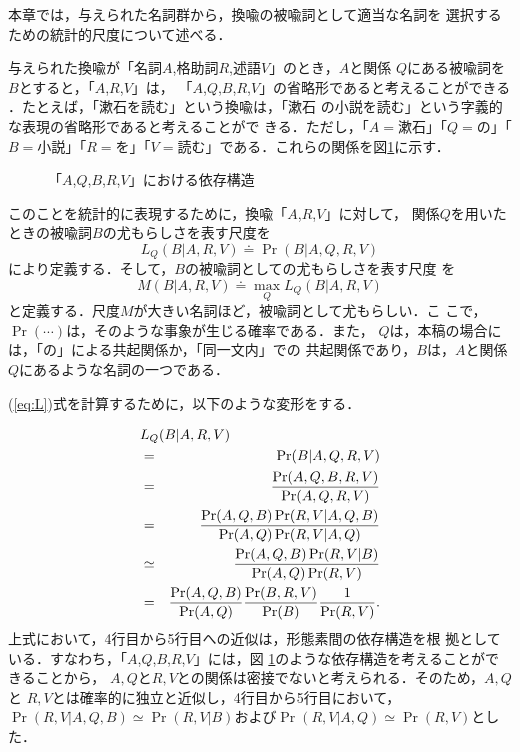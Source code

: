 本章では，与えられた名詞群から，換喩の被喩詞として適当な名詞を
選択するための統計的尺度について述べる．

与えられた換喩が「名詞$A$,格助詞$R$,述語$V$」のとき，$A$と関係
$Q$にある被喩詞を$B$とすると，「$A$,$R$,$V$」は，
「$A$,$Q$,$B$,$R$,$V$」の省略形であると考えることができる
\cite{yamamoto98}．たとえば，「漱石を読む」という換喩は，「漱石
の小説を読む」という字義的な表現の省略形であると考えることがで
きる．ただし，「$A=漱石$」「$Q=の$」「$B=小説$」「$R=を$」「$V=
読む$」である．これらの関係を図\ref{fig:dep}に示す．
\begin{figure}[htbp]
  \begin{center}
    \caption{「$A$,$Q$,$B$,$R$,$V$」における依存構造}
    \label{fig:dep}
  \end{center}
\end{figure}

このことを統計的に表現するために，換喩「$A$,$R$,$V$」に対して，
関係$Q$を用いたときの被喩詞$B$の尤もらしさを表す尺度を
\begin{equation}
  \label{eq:L}
  L_Q(B|A,R,V) \doteq \Pr(B|A,Q,R,V)
\end{equation}
により定義する．そして，$B$の被喩詞としての尤もらしさを表す尺度
を
\begin{equation}
  \label{eq:M}
  M(B|A,R,V) \doteq \max_Q L_Q(B|A,R,V)
\end{equation}
と定義する．尺度$M$が大きい名詞ほど，被喩詞として尤もらしい．こ
こで，$\Pr(\cdots)$は，そのような事象が生じる確率である．また，
$Q$は，本稿の場合には，「の」による共起関係か，「同一文内」での
共起関係であり，$B$は，$A$と関係$Q$にあるような名詞の一つである．

(\ref{eq:L})式を計算するために，以下のような変形をする．

\begin{eqnarray}
  \label{eq:L2}
  \lefteqn{L_Q(B|A,R,V)}\nonumber\\
  & = & \Pr(B|A,Q,R,V) \nonumber\\
  & = & \frac{\Pr(A,Q,B,R,V)}{\Pr(A,Q,R,V)} \nonumber\\
  & = & \frac{\Pr(A,Q,B) \Pr(R,V|A,Q,B)}{\Pr(A,Q) \Pr(R,V|A,Q)} \nonumber\\
  & \simeq & \frac{\Pr(A,Q,B) \Pr(R,V|B)}{\Pr(A,Q)\Pr(R,V)} \nonumber\\
  & = & \frac{\Pr(A,Q,B)}{\Pr(A,Q)}\frac{\Pr(B,R,V)}{\Pr(B)}\frac{1}{\Pr(R,V)}.
\end{eqnarray}
上式において，4行目から5行目への近似は，形態素間の依存構造を根
拠としている．すなわち，「$A$,$Q$,$B$,$R$,$V$」には，図
\ref{fig:dep}のような依存構造を考えることができることから，
$A,Q$と$R,V$との関係は密接でないと考えられる．そのため，$A,Q$と
$R,V$とは確率的に独立と近似し，4行目から5行目において，
$\Pr(R,V|A,Q,B) \simeq \Pr(R,V|B)$および$\Pr(R,V|A,Q) \simeq
\Pr(R,V)$とした．

